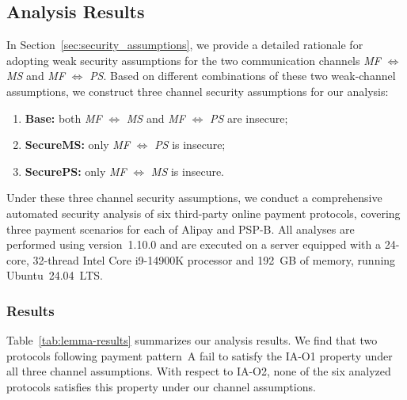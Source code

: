 

\subsection{Analysis Results}

In Section~\ref{sec:security_assumptions}, we provide a detailed rationale for adopting weak security assumptions for the two communication channels \emph{MF} $\Longleftrightarrow$ \emph{MS} and \emph{MF} $\Longleftrightarrow$ \emph{PS}.
Based on different combinations of these two weak-channel assumptions, we construct three channel security assumptions for our analysis:
\begin{enumerate}
  \item \textbf{Base:} both \emph{MF} $\Longleftrightarrow$ \emph{MS} and \emph{MF} $\Longleftrightarrow$ \emph{PS} are insecure;
  \item \textbf{SecureMS:} only \emph{MF} $\Longleftrightarrow$ \emph{PS} is insecure;
  \item \textbf{SecurePS:} only \emph{MF} $\Longleftrightarrow$ \emph{MS} is insecure.
\end{enumerate}

Under these three channel security assumptions, we conduct a comprehensive automated security analysis of six third-party online payment protocols, covering three payment scenarios for each of Alipay and PSP-B.
All analyses are performed using \Tamarin version~1.10.0 and are executed on a server equipped with a 24-core, 32-thread Intel Core i9-14900K processor and 192~GB of memory, running Ubuntu~24.04~LTS.

\subsubsection{Results}

Table~\ref{tab:lemma-results} summarizes our analysis results.
We find that two protocols following payment pattern~A fail to satisfy the IA-O1 property under all three channel assumptions. 
With respect to IA-O2, none of the six analyzed protocols satisfies this property under our channel assumptions.


